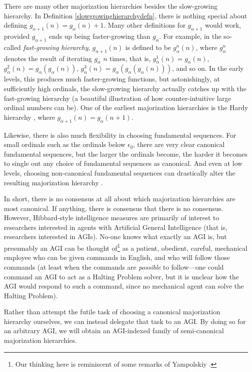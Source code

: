 \documentclass{article}
\begin{document}
There are many other majorization hierarchies besides the slow-growing hierarchy.
In Definition \ref{slowgrowinghierarchydefn},
there is nothing special about defining $g_{\alpha+1}(n)=g_{\alpha}(n)+1$.
Many other definitions for $g_{\alpha+1}$ would work, provided $g_{\alpha+1}$ ends
up being faster-growing than $g_\alpha$.
For example, in the so-called \emph{fast-growing hierarchy},
$g_{\alpha+1}(n)$ is defined to be $g^n_\alpha(n)$, where $g^n_\alpha$
denotes the result of iterating $g_\alpha$ $n$ times, that is,
$g^1_\alpha(n)=g_\alpha(n)$, $g^2_\alpha(n)=g_\alpha(g_\alpha(n))$,
$g^3_\alpha(n)=g_\alpha(g_\alpha(g_\alpha(n)))$, and so on.
In the early levels, this produces much faster-growing functions,
but astonishingly, at sufficiently high ordinals, the slow-growing hierarchy
actually catches up with the fast-growing hierarchy \cite{girard1981pi12}
(a beautiful illustration of how counter-intuitive large ordinal numbers can be).
One of the earliest majorization hierarchies is the Hardy
hierarchy \cite{hardy1904theorem}, where $g_{\alpha+1}(n)=g_\alpha(n+1)$.

Likewise, there is also much flexibility in choosing fundamental sequences.
For small ordinals such as the ordinals below $\epsilon_0$, there are very clear
canonical fundamental sequences, but the larger the ordinals become, the harder
it becomes to single out any choice of fundamental sequences as canonical.
And even at low levels, choosing non-canonical fundamental sequences can
drastically alter the resulting majorization hierarchy \cite{weiermann1997sometimes}.

In short, there is no consensus at all about which majorization hierarchies are
most canonical. If anything, there is consensus that there is no consensus.
However, Hibbard-style intelligence measures are primarily of interest to researchers
interested in agents with Artificial General Intelligence (that is, researchers
interested in AGIs). No-one knows what exactly an AGI is, but presumably an AGI can
be thought of\footnote{Our thinking here is reminiscent of some remarks of
Yampolskiy \cite{yampolskiy2013turing}.} as a patient, obedient, careful,
mechanical employee who can
be given commands in English, and who will follow those commands (at least when
the commands are \emph{possible} to follow---one could command an AGI to act as a
Halting Problem solver, but it is unclear how the AGI would respond to such a command,
since no mechanical agent can solve the Halting Problem).

Rather than attempt the futile task of choosing a canonical majorization hierarchy
ourselves, we can instead delegate that task to an AGI. By doing so for an arbitrary
AGI, we will obtain an AGI-indexed family of semi-canonical majorization hierarchies.
\end{document}
